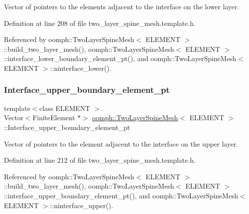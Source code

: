 Vector of pointers to the elements adjacent to the interface on the lower layer. 



Definition at line 208 of file two\+\_\+layer\+\_\+spine\+\_\+mesh.\+template.\+h.



Referenced by oomph\+::\+Two\+Layer\+Spine\+Mesh$<$ E\+L\+E\+M\+E\+N\+T $>$\+::build\+\_\+two\+\_\+layer\+\_\+mesh(), oomph\+::\+Two\+Layer\+Spine\+Mesh$<$ E\+L\+E\+M\+E\+N\+T $>$\+::interface\+\_\+lower\+\_\+boundary\+\_\+element\+\_\+pt(), and oomph\+::\+Two\+Layer\+Spine\+Mesh$<$ E\+L\+E\+M\+E\+N\+T $>$\+::ninterface\+\_\+lower().

\mbox{\label{classoomph_1_1TwoLayerSpineMesh_a81c2202c3169f9fe8c9342b5d95c1a9d}} 
\subsubsection{\texorpdfstring{Interface\+\_\+upper\+\_\+boundary\+\_\+element\+\_\+pt}{Interface\_upper\_boundary\_element\_pt}}
{\footnotesize\ttfamily template$<$class E\+L\+E\+M\+E\+NT $>$ \\
Vector$<$Finite\+Element $\ast$$>$ \hyperlink{classoomph_1_1TwoLayerSpineMesh}{oomph\+::\+Two\+Layer\+Spine\+Mesh}$<$ E\+L\+E\+M\+E\+NT $>$\+::Interface\+\_\+upper\+\_\+boundary\+\_\+element\+\_\+pt\hspace{0.3cm}{\ttfamily [protected]}}



Vector of pointers to the element adjacent to the interface on the upper layer. 



Definition at line 212 of file two\+\_\+layer\+\_\+spine\+\_\+mesh.\+template.\+h.



Referenced by oomph\+::\+Two\+Layer\+Spine\+Mesh$<$ E\+L\+E\+M\+E\+N\+T $>$\+::build\+\_\+two\+\_\+layer\+\_\+mesh(), oomph\+::\+Two\+Layer\+Spine\+Mesh$<$ E\+L\+E\+M\+E\+N\+T $>$\+::interface\+\_\+upper\+\_\+boundary\+\_\+element\+\_\+pt(), and oomph\+::\+Two\+Layer\+Spine\+Mesh$<$ E\+L\+E\+M\+E\+N\+T $>$\+::ninterface\+\_\+upper().

